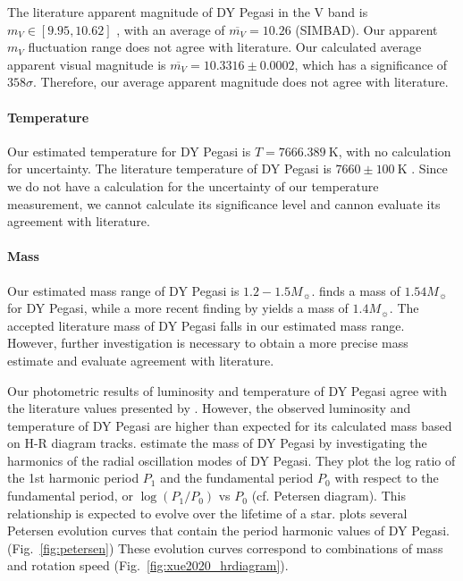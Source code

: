 \documentclass[twocolumn]{aastex631}
\begin{document}
The literature apparent magnitude of DY Pegasi in the V band is $m_V \in [9.95, 10.62]$ \citep{2017_catalog}, with an average of $\overline{m_V} = 10.26$ (SIMBAD). Our apparent $m_V$ fluctuation range does not agree with literature. Our calculated average apparent visual magnitude is $\overline{m_V} = 10.3316 \pm 0.0002$, which has a significance of $358\sigma$. Therefore, our average apparent magnitude does not agree with literature. 

\paragraph{Temperature} Our estimated temperature for DY Pegasi is $T = 7666.389 \ \mathrm{K}$, with no calculation for uncertainty. The literature temperature of DY Pegasi is $7660 \pm 100 \ \mathrm{K}$ \citep{Hintz_2004}. Since we do not have a calculation for the uncertainty of our temperature measurement, we cannot calculate its significance level and cannon evaluate its agreement with literature.

\paragraph{Mass} Our estimated mass range of DY Pegasi is $1.2-1.5M_\sun$. \citet{Hintz_2004} finds a mass of $1.54M_\sun$ for DY Pegasi, while a more recent finding by \citet{Barcza_2014} yields a mass of $1.4M_\sun$. The accepted literature mass of DY Pegasi falls in our estimated mass range. However, further investigation is necessary to obtain a more precise mass estimate and evaluate agreement with literature.

Our photometric results of luminosity and temperature of DY Pegasi agree with the literature values presented by \citet{Xue_2020}. However, the observed luminosity and temperature of DY Pegasi are higher than expected for its calculated mass based on H-R diagram tracks. \citet{Xue_2020} estimate the mass of DY Pegasi by investigating the harmonics of the radial oscillation modes of DY Pegasi. They plot the log ratio of the 1st harmonic period $P_1$ and the fundamental period $P_0$ with respect to the fundamental period, or $\log(P_1 / P_0)$ vs $P_0$ (cf. Petersen diagram). This relationship is expected to evolve over the lifetime of a star. \citet{Xue_2020} plots several Petersen evolution curves that contain the period harmonic values of DY Pegasi. (Fig.\ \ref{fig:petersen}) These evolution curves correspond to combinations of mass and rotation speed (Fig.\ \ref{fig:xue2020_hrdiagram}).
\end{document}
